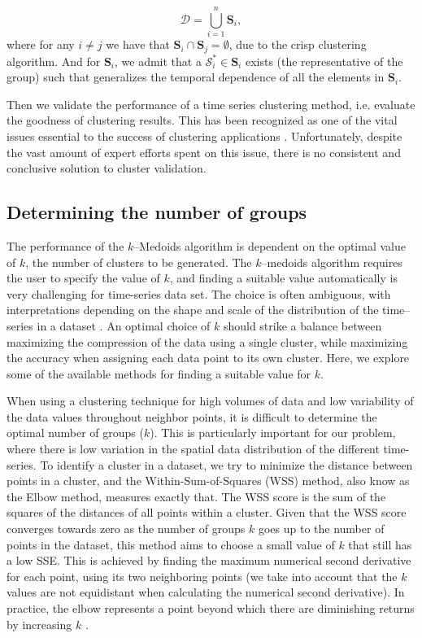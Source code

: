 \begin{equation}
\mathcal{D} = \bigcup_{i=1}^{n} \mathbf{S}_{i},
\end{equation}
where for any $i\neq j$ we have that $\mathbf{S}_{i} \cap \mathbf{S}_{j} = \emptyset$, due to the crisp clustering algorithm. And for $\mathbf{S}_{i}$, we admit that a $\mathcal{S}_{i}^{*} \in \mathbf{S}_{i}$ exists (the representative of the group) such that generalizes the temporal dependence of all the elements in $\mathbf{S}_{i}$. 

Then we validate the performance of a time series clustering method, i.e. evaluate the goodness of clustering results. This has been recognized as one of the vital issues essential to the success of clustering applications \cite{Aggarwal2013}. Unfortunately, despite the vast amount of expert efforts spent on this issue, there is no consistent and conclusive solution to cluster validation. 

\subsection{Determining the number of groups}
\label{Sec:domain_number_groups}

The performance of the $k$--Medoids algorithm is dependent on the optimal value of $k$, the number of clusters to be generated. The $k$--medoids algorithm requires the user to specify the value of $k$, and finding a suitable value automatically is very challenging for time-series data set. The choice is often ambiguous, with interpretations depending on the shape and scale of the distribution of the time--series in a dataset \cite{Liao2005}. An optimal choice of $k$ should strike a balance between maximizing the compression of the data using a single cluster, while maximizing the accuracy when assigning each data point to its own cluster. Here, we explore some of the available methods for finding a suitable value for $k$.

When using a clustering technique for high volumes of data and low variability of the data values throughout neighbor points, it is difficult to determine the optimal number of groups ($k$). This is particularly important for our problem, where there is low variation in the spatial data distribution of the different time-series. 
To identify a cluster in a dataset, we try to minimize the distance between points in a cluster, and the Within-Sum-of-Squares (WSS) method, also know as the Elbow method, measures exactly that. The WSS score is the sum of the squares of the distances of all points within a cluster. Given that the WSS score converges towards zero as the number of groups $k$ goes up to the number of points in the dataset, this method aims to choose a small value of $k$ that still has a low SSE. This is achieved by finding the maximum numerical second derivative for each point, using its two neighboring points (we take into account that the $k$ values are not equidistant when calculating the numerical second derivative). In practice, the elbow represents a point beyond which there are diminishing returns by increasing $k$ \cite{Han2011}.

